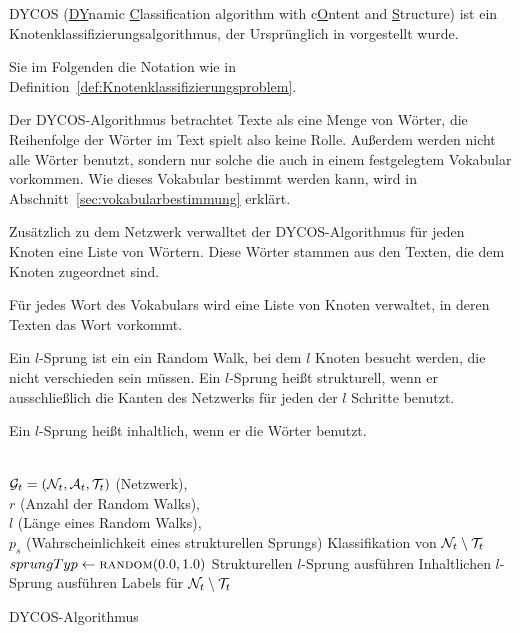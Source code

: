 DYCOS (\underline{DY}namic \underline{C}lassification 
algorithm with c\underline{O}ntent and \underline{S}tructure) ist ein 
Knotenklassifizierungsalgorithmus, der Ursprünglich in \cite{aggarwal2011} vorgestellt 
wurde.

Sie im Folgenden die Notation wie in Definition~\ref{def:Knotenklassifizierungsproblem}.

Der DYCOS-Algorithmus betrachtet Texte als eine Menge von Wörter, 
die Reihenfolge der Wörter im Text spielt also keine Rolle. Außerdem
werden nicht alle Wörter benutzt, sondern nur solche die auch in 
einem festgelegtem Vokabular vorkommen. Wie dieses Vokabular bestimmt
werden kann, wird in Abschnitt~\ref{sec:vokabularbestimmung} erklärt.

Zusätzlich zu dem Netzwerk verwalltet der DYCOS-Algorithmus für jeden
Knoten eine Liste von Wörtern. Diese Wörter stammen aus den Texten,
die dem Knoten zugeordnet sind.

Für jedes Wort des Vokabulars wird eine Liste von Knoten verwaltet, 
in deren Texten das Wort vorkommt.

Ein $l$-Sprung ist ein ein Random Walk, bei dem $l$
Knoten besucht werden, die nicht verschieden sein müssen. Ein 
$l$-Sprung heißt strukturell, wenn er ausschließlich die Kanten
des Netzwerks für jeden der $l$ Schritte benutzt.

Ein $l$-Sprung heißt inhaltlich, wenn er die Wörter benutzt.

\begin{algorithm}[H]
    \begin{algorithmic}
        \Require \\$\mathcal{G}_t = (\mathcal{N}_t, \mathcal{A}_t, \mathcal{T}_t)$ (Netzwerk),\\
                 $r$ (Anzahl der Random Walks),\\
                 $l$ (Länge eines Random Walks),\\
                 $p_s$ (Wahrscheinlichkeit eines strukturellen Sprungs)
        \Ensure  Klassifikation von $\mathcal{N}_t \setminus \mathcal{T}_t$\\

                \State $sprungTyp \gets \Call{random}{0.0, 1.0}$
                    \State Strukturellen $l$-Sprung ausführen
                \Else
                    \State Inhaltlichen $l$-Sprung ausführen
                \EndIf
            \EndFor
        \EndFor
        \State \Return Labels für $\mathcal{N}_t \setminus \mathcal{T}_t$
    \end{algorithmic}
\caption{DYCOS-Algorithmus}
\label{alg:DYCOS}
\end{algorithm}

